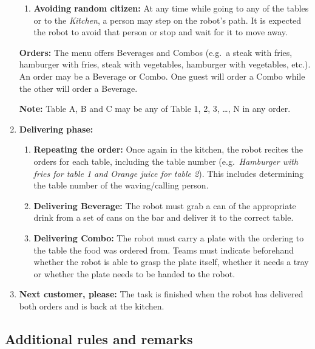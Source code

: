 \begin{enumerate}
\begin{enumerate}
\item \textbf{Avoiding random citizen:} At any time while going to any of the tables or to the \textit{Kitchen}, a person may step on the robot's path. It is expected the robot to avoid that person or stop and wait for it to move away.
\end{enumerate}

\textbf{Orders:} The menu offers Beverages and Combos (e.g.~a steak with fries, hamburger with fries, steak with vegetables, hamburger with vegetables, etc.). An order may be a Beverage or Combo. One guest will order a Combo while the other will order a Beverage.

\textbf{Note:} Table A, B and C may be any of Table 1, 2, 3, \dots, N in any order.

\item \textbf{Delivering phase:}
\begin{enumerate}
\item \textbf{Repeating the order:} Once again in the kitchen, the robot recites the orders for each table, including the table number (e.g.~\textit{Hamburger with fries for table 1 and Orange juice for table 2}). This includes determining the table number of the waving/calling person.

\item \textbf{Delivering Beverage:} The robot must grab a can of the appropriate drink from a set of cans on the bar and deliver it to the correct table.

\item \textbf{Delivering Combo:}  The robot must carry a plate with the ordering to the table the food was ordered from. Teams must indicate beforehand whether the robot is able to grasp the plate itself, whether it needs a tray or whether the plate needs to be handed to the robot.
\end{enumerate}

\item \textbf{Next customer, please:} The task is finished when the robot has delivered both orders and is back at the kitchen.
\end{enumerate}

\subsection{Additional rules and remarks}

